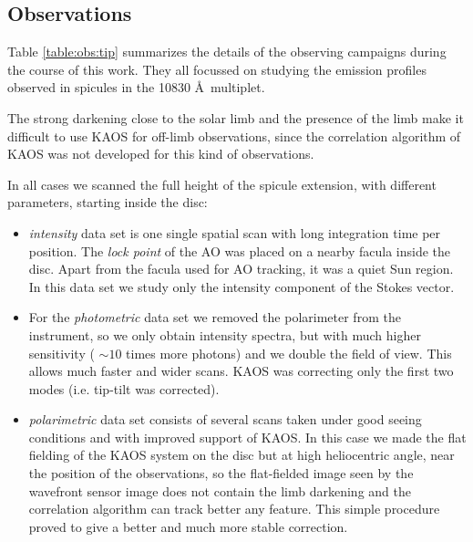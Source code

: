 \subsection{Observations\label{obs:tip}}

Table \ref{table:obs:tip} summarizes the details of the observing campaigns during the course of this work. They all  focussed on studying the emission profiles observed in spicules in the  10830 \AA\  multiplet. 

The strong darkening close to the solar limb and the presence of the
limb make it difficult to use KAOS for off-limb observations, since the
correlation algorithm of KAOS was not developed for this kind of observations. 

In all cases we scanned the full height of the spicule extension, with different parameters, starting inside the disc:
\begin{itemize}
\item \emph{intensity} data set is one single spatial scan with long integration time per position. The \emph{lock point} of the AO was placed on a nearby facula inside the disc. Apart from the facula used for AO tracking, it was a quiet Sun region. In this data set we study only the intensity component of the Stokes vector.
\item For the \emph{photometric} data set we removed the polarimeter from the instrument, so we only obtain intensity spectra, but with much higher sensitivity ( $\sim 10$ times more photons) and we double the field of view. This allows much faster and wider scans. KAOS was correcting only the first two modes (i.e. tip-tilt was corrected).
\item \emph{polarimetric} data set consists of several scans taken under good seeing conditions and with improved support of KAOS. In this case we made the flat fielding of the KAOS system on the disc but at high heliocentric angle, near the position of the observations, so the flat-fielded image seen by the wavefront sensor image does not contain the limb darkening and the correlation algorithm can track better any feature. This simple procedure proved to give a better and much more stable correction.

\end{itemize}


